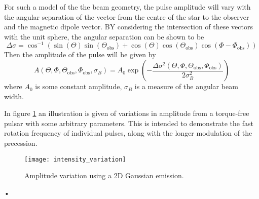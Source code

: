 \documentclass[../full_thesis/full_thesis.tex]{subfiles}
\begin{document}
For such a model of the the beam geometry, the pulse amplitude will vary with the
angular separation of the vector from the centre of the star to the observer and the
magnetic dipole vector. BY considering the intersection of these vectors with
the unit sphere, the angular separation can be shown to be
\newcommand{\ThetaO}{\Theta_{\mathrm{obs}}}
\newcommand{\PhiO}{\Phi_{\mathrm{obs}}}
\newcommand{\sigmaB}{\sigma_{B}}
\begin{equation}
\Delta\sigma = \cos^{-1}\left(\sin(\Theta)\sin(\ThetaO) +
                             \cos(\Theta)\cos(\ThetaO)\cos(\Phi - \PhiO)\right)
\label{eqn: angular sep inv cos}
\end{equation}
Then the amplitude of the pulse will be given by
\begin{equation}
A(\Theta, \Phi, \ThetaO, \PhiO, \sigmaB) =
A_{0} \exp\left(-\frac{\Delta\sigma^{2}(\Theta, \Phi, \ThetaO, \PhiO)}{2\sigmaB^{2}}\right)
\label{eqn: beam amplitude}
\end{equation}
where $A_{0}$ is some constant amplitude, $\sigmaB$ is a measure of the
angular beam width.

In figure \ref{fig: amplitude variation} an illustration is given of variations
in amplitude from a torque-free pulsar with some arbitrary parameters. This is
intended to demonstrate the fast rotation frequency of individual pulses, along
with the longer modulation of the precession.
\begin{figure}[htb]
\centering
\texttt{[image: intensity\_variation]}
\caption{Amplitude variation using a 2D Gaussian emission.}
\label{fig: amplitude variation}
\end{figure}•

\end{document}
